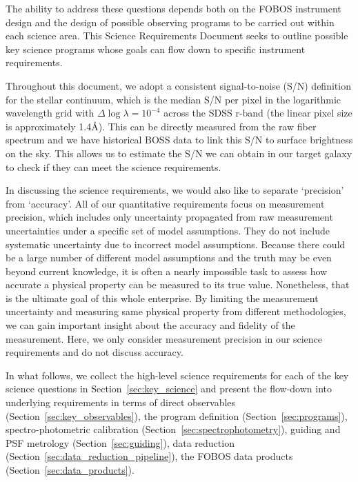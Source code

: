 \documentclass[preprint,11pt]{aastex}
\begin{document}
The ability to address these questions depends both on the FOBOS instrument design and the design of possible observing programs to be carried out within each science area.  This Science Requirements Document seeks to outline possible key science programs whose goals can flow down to specific instrument requirements.

Throughout this document, we adopt a consistent signal-to-noise (S/N)
definition for the stellar continuum, which is the median S/N per
pixel in the logarithmic wavelength grid with $\Delta \log \lambda =
10^{-4}$ across the SDSS r-band (the linear pixel size is
approximately 1.4\AA). This can be directly measured from the raw
fiber spectrum and we have historical BOSS data to link this S/N to
surface brightness on the sky. This allows us to estimate the S/N we
can obtain in our target galaxy to check if they can meet the science
requirements.

In discussing the science requirements, we would also like to separate
`precision' from `accuracy'. All of our quantitative requirements
focus on measurement precision, which includes only uncertainty
propagated from raw measurement uncertainties under a specific set of
model assumptions. They do not include systematic uncertainty due to
incorrect model assumptions. Because there could be a large number of
different model assumptions and the truth may be even beyond current
knowledge, it is often a nearly impossible task to assess how accurate
a physical property can be measured to its true value. Nonetheless,
that is the ultimate goal of this whole enterprise. By limiting the
measurement uncertainty and measuring same physical property from
different methodologies, we can gain important insight about the
accuracy and fidelity of the measurement. Here, we only consider
measurement precision in our science requirements and do not discuss
accuracy.


In what follows, we collect the high-level science requirements for
each of the key science questions in Section~\ref{sec:key_science} and
present the flow-down into underlying requirements in terms of direct
observables (Section~\ref{sec:key_observables}), the program definition (Section~\ref{sec:programs}), spectro-photometric calibration
(Section~\ref{sec:spectrophotometry}), guiding and PSF metrology
(Section~\ref{sec:guiding}), data reduction
(Section~\ref{sec:data_reduction_pipeline}), the FOBOS
data products (Section~\ref{sec:data_products}).



\newpage
\end{document}
